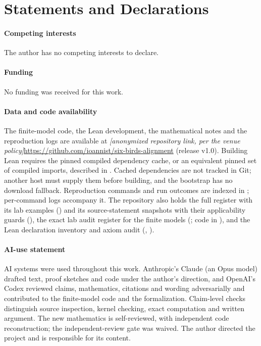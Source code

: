 \documentclass[pdflatex,sn-basic]{sn-jnl}%
\providecommand{\bmhead}[1]{\paragraph*{#1}}
\newcommand{\slot}[1]{}%
\newcommand{\placeholder}[1]{\textcolor{stubfg}{\textit{[#1]}}}%
\newcommand{\renderchoice}[2]{\ifanonymous#2\else#1\fi}%
\newcommand{\repolink}{\renderchoice{\url{https://github.com/ioannist/six-birds-alignment}}{\placeholder{anonymized repository link, per the venue policy}}}
\newcommand{\repocommit}{v1.0}
\begin{document}
\section*{Statements and Declarations}\label{sec:declarations}
\slot{S.1}
\bmhead{Competing interests}The author has no competing interests to declare.
\bmhead{Funding}No funding was received for this work.
\bmhead{Data and code availability}The finite-model code, the Lean development, the mathematical notes and the reproduction logs are available at \repolink{} (release \repocommit). Building Lean requires the pinned compiled dependency cache, or an equivalent pinned set of compiled imports, described in . Cached dependencies are not tracked in Git; another host must supply them before building, and the bootstrap has no download fallback. Reproduction commands and run outcomes are indexed in ; per-command logs accompany it. The repository also holds the full register with its lab examples () and its source-statement snapshots with their applicability guards (), the exact lab audit register for the finite models (; code in ), and the Lean declaration inventory and axiom audit (, ). %
\slot{S.2}
\bmhead{AI-use statement}AI systems were used throughout this work. Anthropic's Claude (an Opus model) drafted text, proof sketches and code under the author's direction, and OpenAI's Codex reviewed claims, mathematics, citations and wording adversarially and contributed to the finite-model code and the formalization. Claim-level checks distinguish source inspection, kernel checking, exact computation and written argument. The new mathematics is self-reviewed, with independent code reconstruction; the independent-review gate was waived. The author directed the project and is responsible for its content.
\slot{S.3}
\slot{S.4}
\end{document}
